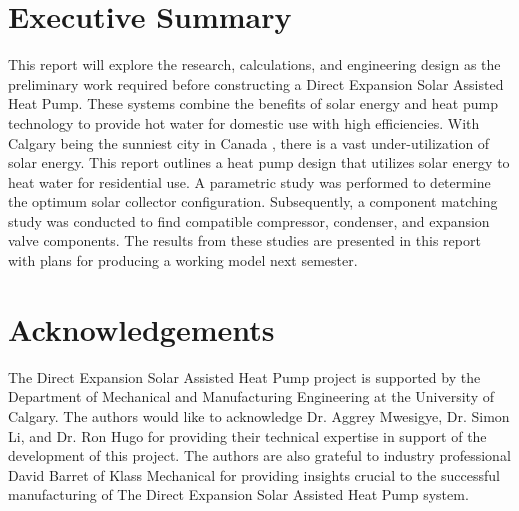 \documentclass{ucalgarythesis}
\begin{document}
\frontmatter
\makethesistitle
\newpage


\chapter{Executive Summary}
This report will explore the research, calculations, and engineering design as the preliminary work required before constructing a Direct Expansion Solar Assisted Heat Pump. These systems combine the benefits of solar energy and heat pump technology to provide hot water for domestic use with high efficiencies. With Calgary being the sunniest city in Canada \cite{calgary_sun}, there is a vast under-utilization of solar energy. This report outlines a heat pump design that utilizes solar energy to heat water for residential use. A parametric study was performed to determine the optimum solar collector configuration. Subsequently, a component matching study was conducted to find compatible compressor, condenser, and expansion valve components. The results from these studies are presented in this report with plans for producing a working model next semester.
\newpage

 
\chapter{Acknowledgements}  
The Direct Expansion Solar Assisted Heat Pump project is supported by the Department of Mechanical and Manufacturing Engineering at the University of Calgary. The authors would like to acknowledge Dr. Aggrey Mwesigye, Dr. Simon Li, and Dr. Ron Hugo for providing their technical expertise in support of the development of this project. The authors are also grateful to industry professional David Barret of Klass Mechanical for providing insights crucial to the successful manufacturing of The Direct Expansion Solar Assisted Heat Pump system.
\newpage

    
\tableofcontents
\newpage


\listoffigures
\newpage
\end{document}
